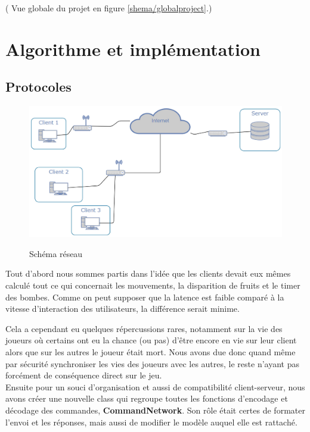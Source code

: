 \documentclass[a4paper]{article}
\begin{document}
	( Vue globale du projet en figure \ref{shema/globalproject}.)

	
	\section{Algorithme et implémentation}
		\subsection{Protocoles}
		
\begin{figure}[!htbp]
	\centering
	\includegraphics[width=\textwidth]{IMG_Latex/Network.jpg}\\
	\caption{Schéma réseau}
	\label{shema/network}
\end{figure}

\newpage

Tout d'abord nous sommes partis dans l'idée que les clients devait eux mêmes calculé tout ce qui concernait les mouvements, la disparition de fruits et le timer des bombes. Comme on peut supposer que la latence est faible comparé à la vitesse d'interaction des utilisateurs, la différence serait minime.

Cela a cependant eu quelques répercussions rares, notamment sur la vie des joueurs où certains ont eu la chance (ou pas) d'être encore en vie sur leur client alors que sur les autres le joueur était mort. Nous avons due donc quand même par sécurité synchroniser les vies des joueurs avec les autres, le reste n'ayant pas forcément de conséquence direct sur le jeu.
\\

Ensuite pour un souci d'organisation et aussi de compatibilité client-serveur, nous avons créer une nouvelle class qui regroupe toutes les fonctions d'encodage et décodage des commandes, \textbf{CommandNetwork}. Son rôle était certes de formater l'envoi et les réponses, mais aussi de modifier le modèle auquel elle est rattaché.
\end{document}
